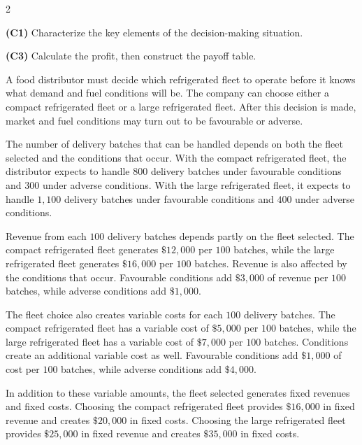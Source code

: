\begin{multicols}{2}
		\begin{alphenum}
			\item \textbf{(C1)} Characterize the key elements of the decision-making situation. 
			\item \textbf{(C3)} Calculate the profit, then construct the payoff table. 
		\end{alphenum}


		A food distributor must decide which refrigerated fleet to operate before it knows what demand and fuel conditions will be. The company can choose either a compact refrigerated fleet or a large refrigerated fleet. After this decision is made, market and fuel conditions may turn out to be favourable or adverse.
		
		The number of delivery batches that can be handled depends on both the fleet selected and the conditions that occur. With the compact refrigerated fleet, the distributor expects to handle $800$ delivery batches under favourable conditions and $300$ under adverse conditions. With the large refrigerated fleet, it expects to handle $1{,}100$ delivery batches under favourable conditions and $400$ under adverse conditions.
		
		Revenue from each $100$ delivery batches depends partly on the fleet selected. The compact refrigerated fleet generates $\$12{,}000$ per $100$ batches, while the large refrigerated fleet generates $\$16{,}000$ per $100$ batches. Revenue is also affected by the conditions that occur. Favourable conditions add $\$3{,}000$ of revenue per $100$ batches, while adverse conditions add $\$1{,}000$.
		
		The fleet choice also creates variable costs for each $100$ delivery batches. The compact refrigerated fleet has a variable cost of $\$5{,}000$ per $100$ batches, while the large refrigerated fleet has a variable cost of $\$7{,}000$ per $100$ batches. Conditions create an additional variable cost as well. Favourable conditions add $\$1{,}000$ of cost per $100$ batches, while adverse conditions add $\$4{,}000$.
		
		In addition to these variable amounts, the fleet selected generates fixed revenues and fixed costs. Choosing the compact refrigerated fleet provides $\$16{,}000$ in fixed revenue and creates $\$20{,}000$ in fixed costs. Choosing the large refrigerated fleet provides $\$25{,}000$ in fixed revenue and creates $\$35{,}000$ in fixed costs.
		

\end{multicols}
